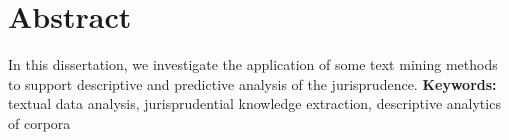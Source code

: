 \chapter*{Abstract}
In this dissertation, we investigate the application of some text mining methods to support descriptive and predictive analysis of the jurisprudence.
\textbf{Keywords:} textual data analysis, jurisprudential knowledge extraction, descriptive analytics of corpora



